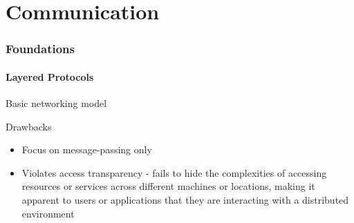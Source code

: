 \part{Communication}
\section{Foundations}
\subsection{Layered Protocols}
\begin{slide}{Basic networking model}
  \begin{block}{}
    \begin{center}
    \end{center}
  \end{block}
  \begin{block}{Drawbacks}
    \begin{itemize}\tightlist
    \item Focus on message-passing only
    \item Violates access transparency - fails to hide the complexities of 
    accessing resources or services across different machines or locations, making it apparent to users or applications that 
    they are interacting with a distributed environment
    \end{itemize}
  \end{block}
\end{slide}
